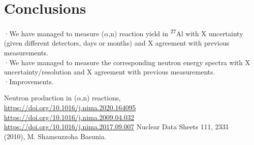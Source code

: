 \documentclass[a4paper,12pt]{report}
\newcommand{\an}{($\alpha$,n) }
\newcommand{\Aliso}{\textsuperscript{27}Al }
\begin{document}
\chapter{Conclusions}
·We have managed to measure \an reaction yield in \Aliso with X uncertainty (given different detectors, days or months) and X agreement with previous measurements.\\
·We have managed to measure the corresponding neutron energy spectra with X uncertainty/resolution and X agreement with previous measurements.\\
·Improvements.\\

\begin{thebibliography}{5}
	Neutron production in \an reactions, \url{https://doi.org/10.1016/j.nima.2020.164095}
	\bibitem{}\url{https://doi.org/10.1016/j.nima.2009.04.032}
	\bibitem{}\url{https://doi.org/10.1016/j.nima.2017.09.007}
	Nuclear Data Sheets 111, 2331 (2010), M. Shamsuzzoha Basunia.
\end{thebibliography}
\end{document}
